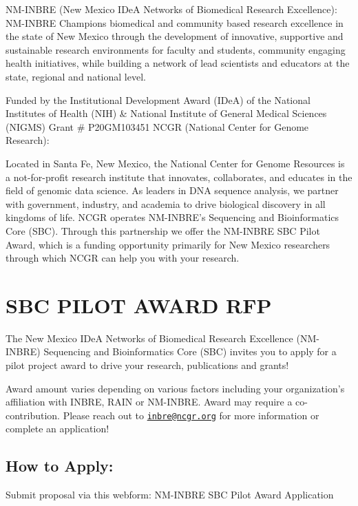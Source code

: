 \documentclass[
]{book}
\begin{document}
NM-INBRE (New Mexico IDeA Networks of Biomedical Research Excellence):
NM-INBRE Champions biomedical and community based research excellence in the state of New Mexico through the development of innovative, supportive and sustainable research environments for faculty and students, community engaging health initiatives, while building a network of lead scientists and educators at the state, regional and national level.

Funded by the Institutional Development Award (IDeA) of the National Institutes of Health (NIH) \& National Institute of General Medical Sciences (NIGMS) Grant \# P20GM103451
NCGR (National Center for Genome Research):

Located in Santa Fe, New Mexico, the National Center for Genome Resources is a not-for-profit research institute that innovates, collaborates, and educates in the field of genomic data science. As leaders in DNA sequence analysis, we partner with government, industry, and academia to drive biological discovery in all kingdoms of life.
NCGR operates NM-INBRE's Sequencing and Bioinformatics Core (SBC). Through this partnership we offer the NM-INBRE SBC Pilot Award, which is a funding opportunity primarily for New Mexico researchers through which NCGR can help you with your research.

\hypertarget{sbc-pilot-award-rfp}{%
\chapter{SBC PILOT AWARD RFP}\label{sbc-pilot-award-rfp}}

The New Mexico IDeA Networks of Biomedical Research Excellence (NM-INBRE) Sequencing and Bioinformatics Core (SBC) invites you to apply for a pilot project award to drive your research, publications and grants!

Award amount varies depending on various factors including your organization's affiliation with INBRE, RAIN or NM-INBRE. Award may require a co-contribution. Please reach out to \href{mailto:inbre@ncgr.org}{\nolinkurl{inbre@ncgr.org}} for more information or complete an application!

\hypertarget{how-to-apply}{%
\section{How to Apply:}\label{how-to-apply}}

Submit proposal via this webform: NM-INBRE SBC Pilot Award Application\hspace{0pt}\hspace{0pt}
\end{document}
